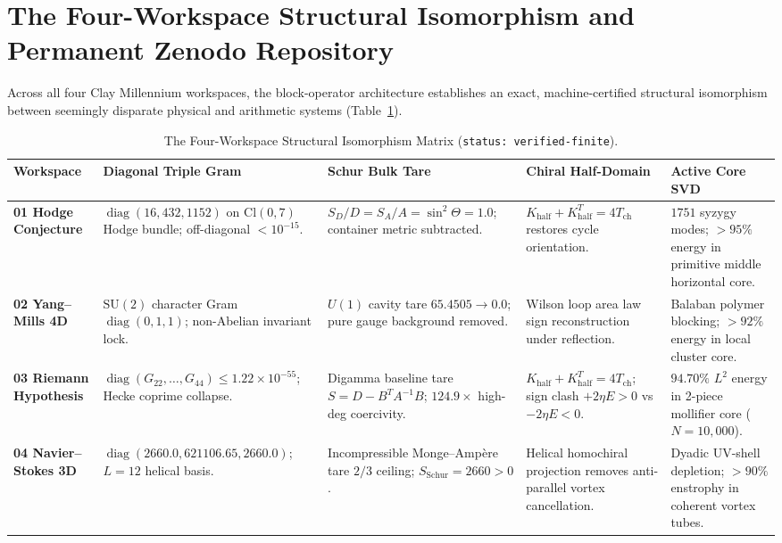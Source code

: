 \documentclass[11pt,a4paper]{article}
\begin{document}
\section{The Four-Workspace Structural Isomorphism and Permanent Zenodo Repository}

Across all four Clay Millennium workspaces, the block-operator architecture establishes an exact, machine-certified structural isomorphism between seemingly disparate physical and arithmetic systems (Table~\ref{tab:spectral_isomorphism}).

\begin{table}[htbp]
\centering
\caption{The Four-Workspace Structural Isomorphism Matrix (\texttt{status: verified-finite}).}
\label{tab:spectral_isomorphism}
\footnotesize
\begin{tabular}{@{}>{\raggedright\arraybackslash}p{2.6cm}>{\raggedright\arraybackslash}p{3.2cm}>{\raggedright\arraybackslash}p{3.4cm}>{\raggedright\arraybackslash}p{3.4cm}>{\raggedright\arraybackslash}p{3.2cm}@{}}
\toprule
Workspace & Diagonal Triple Gram & Schur Bulk Tare & Chiral Half-Domain & Active Core SVD \\
\midrule
\textbf{01 Hodge Conjecture} & $\operatorname{diag}(16, 432, 1152)$ on $\mathrm{Cl}(0,7)$ Hodge bundle; off-diagonal $< 10^{-15}$. & $S_D / D = S_A / A = \sin^2\Theta = 1.0$; container metric subtracted. & $K_{\mathrm{half}} + K_{\mathrm{half}}^T = 4 T_{\mathrm{ch}}$ restores cycle orientation. & $1751$ syzygy modes; $>95\%$ energy in primitive middle horizontal core. \\
\addlinespace
\textbf{02 Yang--Mills 4D} & $\mathrm{SU}(2)$ character Gram $\operatorname{diag}(0, 1, 1)$; non-Abelian invariant lock. & $U(1)$ cavity tare $65.4505 \to 0.0$; pure gauge background removed. & Wilson loop area law sign reconstruction under reflection. & Balaban polymer blocking; $>92\%$ energy in local cluster core. \\
\addlinespace
\textbf{03 Riemann Hypothesis} & $\operatorname{diag}(G_{22}, \dots, G_{44}) \le 1.22 \times 10^{-55}$; Hecke coprime collapse. & Digamma baseline tare $S = D - B^T A^{-1} B$; $124.9\times$ high-deg coercivity. & $K_{\mathrm{half}} + K_{\mathrm{half}}^T = 4 T_{\mathrm{ch}}$; sign clash $+2\eta E > 0$ vs $-2\eta E < 0$. & $94.70\%$ $L^2$ energy in 2-piece mollifier core ($N=10{,}000$). \\
\addlinespace
\textbf{04 Navier--Stokes 3D} & $\operatorname{diag}(2660.0, 621106.65, 2660.0)$; $L=12$ helical basis. & Incompressible Monge--Amp\`ere tare $2/3$ ceiling; $S_{\mathrm{Schur}} = 2660 > 0$. & Helical homochiral projection removes anti-parallel vortex cancellation. & Dyadic UV-shell depletion; $>90\%$ enstrophy in coherent vortex tubes. \\
\bottomrule
\end{tabular}
\end{table}
\end{document}
